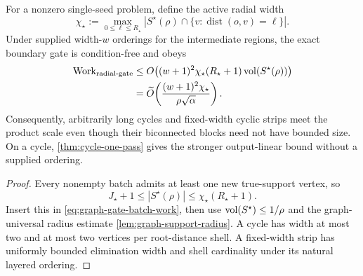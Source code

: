 \begin{corollary}
\label{cor:radial-width-gate}
For a nonzero single-seed problem, define the active radial width
\begin{equation}
 \chi_\star
 :=\max_{0\leq\ell\leq R_\star}
 \left|
  S^\star(\rho)\cap
  \{v:\operatorname{dist}(o,v)=\ell\}
 \right|.
 \label{eq:active-radial-width}
\end{equation}
Under supplied width-$w$ orderings for the intermediate regions, the exact
boundary gate is condition-free and obeys
\begin{align}
 \operatorname{Work}_{\rm radial\text{-}gate}
 &\leq
 O\!\left(
  (w+1)^2\chi_\star(R_\star+1)
  \operatorname{vol}(S^\star(\rho))
 \right)
 \notag\\
 &=\widetilde O\!\left(
  \frac{(w+1)^2\chi_\star}{\rho\sqrt\alpha}
 \right).
 \label{eq:radial-width-gate-work}
\end{align}
Consequently, arbitrarily long cycles and fixed-width cyclic strips meet the
product scale even though their biconnected blocks need not have bounded
size.  On a cycle, \cref{thm:cycle-one-pass} gives the stronger
output-linear bound without a supplied ordering.
\end{corollary}

\begin{proof}
Every nonempty batch admits at least one new true-support vertex, so
\begin{equation*}
 J_\star+1
 \leq |S^\star(\rho)|
 \leq \chi_\star(R_\star+1).
\end{equation*}
Insert this in \cref{eq:graph-gate-batch-work}, then use
$\operatorname{vol}(S^\star)\leq1/\rho$ and the graph-universal radius estimate
\cref{lem:graph-support-radius}.  A cycle has width at most two and at most
two vertices per root-distance shell.  A fixed-width strip has uniformly
bounded elimination width and shell cardinality under its natural layered
ordering.
\end{proof}

